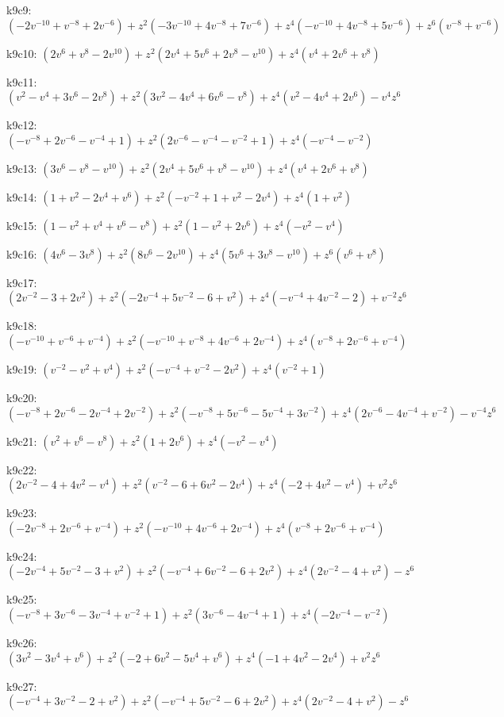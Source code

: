 k9c9: $ (-2v^{-10}+v^{-8}+2v^{-6})  +z^{2}(-3v^{-10}+4v^{-8}+7v^{-6})  +z^{4}(-v^{-10}+4v^{-8}+5v^{-6})  +z^{6}(v^{-8}+v^{-6}) $ 

k9c10: $ (2v^{6}+v^{8}-2v^{10})  +z^{2}(2v^{4}+5v^{6}+2v^{8}-v^{10})  +z^{4}(v^{4}+2v^{6}+v^{8}) $ 

k9c11: $ (v^{2}-v^{4}+3v^{6}-2v^{8})  +z^{2}(3v^{2}-4v^{4}+6v^{6}-v^{8})  +z^{4}(v^{2}-4v^{4}+2v^{6})  -v^{4}z^{6} $ 

k9c12: $ (-v^{-8}+2v^{-6}-v^{-4}+1)  +z^{2}(2v^{-6}-v^{-4}-v^{-2}+1)  +z^{4}(-v^{-4}-v^{-2}) $ 

k9c13: $ (3v^{6}-v^{8}-v^{10})  +z^{2}(2v^{4}+5v^{6}+v^{8}-v^{10})  +z^{4}(v^{4}+2v^{6}+v^{8}) $ 

k9c14: $ (1+v^{2}-2v^{4}+v^{6})  +z^{2}(-v^{-2}+1+v^{2}-2v^{4})  +z^{4}(1+v^{2}) $ 

k9c15: $ (1-v^{2}+v^{4}+v^{6}-v^{8})  +z^{2}(1-v^{2}+2v^{6})  +z^{4}(-v^{2}-v^{4}) $ 

k9c16: $ (4v^{6}-3v^{8})  +z^{2}(8v^{6}-2v^{10})  +z^{4}(5v^{6}+3v^{8}-v^{10})  +z^{6}(v^{6}+v^{8}) $ 

k9c17: $ (2v^{-2}-3+2v^{2})  +z^{2}(-2v^{-4}+5v^{-2}-6+v^{2})  +z^{4}(-v^{-4}+4v^{-2}-2)  +v^{-2}z^{6} $ 

k9c18: $ (-v^{-10}+v^{-6}+v^{-4})  +z^{2}(-v^{-10}+v^{-8}+4v^{-6}+2v^{-4})  +z^{4}(v^{-8}+2v^{-6}+v^{-4}) $ 

k9c19: $ (v^{-2}-v^{2}+v^{4})  +z^{2}(-v^{-4}+v^{-2}-2v^{2})  +z^{4}(v^{-2}+1) $ 

k9c20: $ (-v^{-8}+2v^{-6}-2v^{-4}+2v^{-2})  +z^{2}(-v^{-8}+5v^{-6}-5v^{-4}+3v^{-2})  +z^{4}(2v^{-6}-4v^{-4}+v^{-2})  -v^{-4}z^{6} $ 

k9c21: $ (v^{2}+v^{6}-v^{8})  +z^{2}(1+2v^{6})  +z^{4}(-v^{2}-v^{4}) $ 

k9c22: $ (2v^{-2}-4+4v^{2}-v^{4})  +z^{2}(v^{-2}-6+6v^{2}-2v^{4})  +z^{4}(-2+4v^{2}-v^{4})  +v^{2}z^{6} $ 

k9c23: $ (-2v^{-8}+2v^{-6}+v^{-4})  +z^{2}(-v^{-10}+4v^{-6}+2v^{-4})  +z^{4}(v^{-8}+2v^{-6}+v^{-4}) $ 

k9c24: $ (-2v^{-4}+5v^{-2}-3+v^{2})  +z^{2}(-v^{-4}+6v^{-2}-6+2v^{2})  +z^{4}(2v^{-2}-4+v^{2})  -z^{6} $ 

k9c25: $ (-v^{-8}+3v^{-6}-3v^{-4}+v^{-2}+1)  +z^{2}(3v^{-6}-4v^{-4}+1)  +z^{4}(-2v^{-4}-v^{-2}) $ 

k9c26: $ (3v^{2}-3v^{4}+v^{6})  +z^{2}(-2+6v^{2}-5v^{4}+v^{6})  +z^{4}(-1+4v^{2}-2v^{4})  +v^{2}z^{6} $ 

k9c27: $ (-v^{-4}+3v^{-2}-2+v^{2})  +z^{2}(-v^{-4}+5v^{-2}-6+2v^{2})  +z^{4}(2v^{-2}-4+v^{2})  -z^{6} $ 

